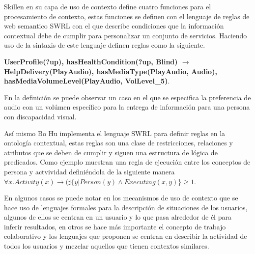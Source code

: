 Skillen \cite{Skillen201497} en su capa de uso de contexto define cuatro funciones para el procesamiento de contexto, estas funciones se definen con el lenguaje de reglas de web semantico SWRL con el que describe condiciones que la informaci\'on contextual debe de cumplir para personalizar un conjunto de servicios. Haciendo uso de la sintaxis de este lenguaje definen reglas como la siguiente. 

\textbf{UserProfile(?up), hasHealthCondition(?up, Blind) $\rightarrow$ HelpDelivery(PlayAudio), hasMediaType(PlayAudio, Audio), hasMediaVolumeLevel(PlayAudio, VolLevel\_5)}. 

En la definici\'on se puede observar un caso en el que se especifica la preferencia de audio con un vol\'umen espec\'ifico para la entrega de informaci\'on para una persona con discapacidad visual.

As\'i mismo Bo Hu \cite{bohu2013} implementa el lenguaje SWRL para definir reglas en la ontolog\'ia contextual, estas reglas son una clase de restricciones, relaciones y atributos que se deben de cumplir y siguen una estructura de l\'ogica de predicados. Como ejemplo muestran una regla de ejecuci\'on entre los conceptos de persona y actvividad defini\'endola de la siguiente manera $\forall x.Activity(x) \rightarrow (\sharp \{y|Person(y)\wedge Executing(x,y)\} \geq 1$.


En algunos casos se puede notar en los mecanismos de uso de contexto que se hace uso de lenguajes formales para la descripci\'on de situaciones de los usuarios, algunos de ellos se centran en un usuario y lo que pasa alrededor de \'el para inferir resultados, en otros se hace m\'as importante el concepto de trabajo colaborativo y los lenguajes que proponen se centran en describir la actividad de todos los usuarios y mezclar aquellos que tienen contextos similares.
